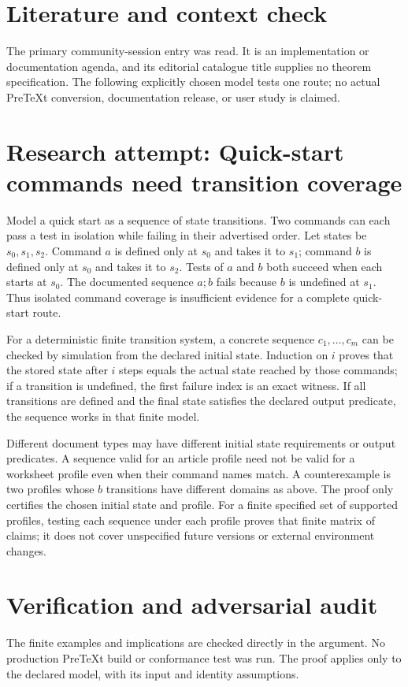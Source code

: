 \documentclass[11pt]{article}
\begin{document}
\section{Literature and context check}
The primary community-session entry was read. It is an implementation or documentation agenda, and its editorial catalogue title supplies no theorem specification. The following explicitly chosen model tests one route; no actual PreTeXt conversion, documentation release, or user study is claimed.
\section{Research attempt: Quick-start commands need transition coverage}
Model a quick start as a sequence of state transitions. Two commands can each pass a test in isolation while failing in their advertised order. Let states be $s_0,s_1,s_2$. Command $a$ is defined only at $s_0$ and takes it to $s_1$; command $b$ is defined only at $s_0$ and takes it to $s_2$. Tests of $a$ and $b$ both succeed when each starts at $s_0$. The documented sequence $a;b$ fails because $b$ is undefined at $s_1$. Thus isolated command coverage is insufficient evidence for a complete quick-start route.

For a deterministic finite transition system, a concrete sequence $c_1,\ldots,c_m$ can be checked by simulation from the declared initial state. Induction on $i$ proves that the stored state after $i$ steps equals the actual state reached by those commands; if a transition is undefined, the first failure index is an exact witness. If all transitions are defined and the final state satisfies the declared output predicate, the sequence works in that finite model.

Different document types may have different initial state requirements or output predicates. A sequence valid for an article profile need not be valid for a worksheet profile even when their command names match. A counterexample is two profiles whose $b$ transitions have different domains as above. The proof only certifies the chosen initial state and profile. For a finite specified set of supported profiles, testing each sequence under each profile proves that finite matrix of claims; it does not cover unspecified future versions or external environment changes.
\section{Verification and adversarial audit}
The finite examples and implications are checked directly in the argument. No production PreTeXt build or conformance test was run. The proof applies only to the declared model, with its input and identity assumptions.
\end{document}
